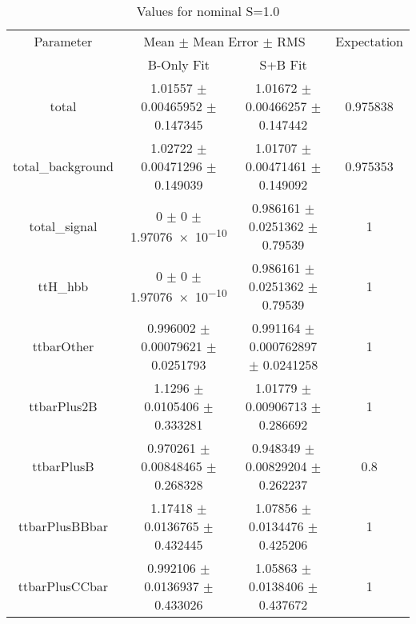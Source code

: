 \begin{table}
\centering
\caption{Values for nominal S=1.0}
\begin{tabular}{cccc}
\toprule
Parameter & \multicolumn{2}{c}{Mean $\pm$ Mean Error $\pm$ RMS} & Expectation\\
 & B-Only Fit & S+B Fit & \\
\midrule
total & \num{1.01557} $\pm$ \num{0.00465952} $\pm$ \num{0.147345} & \num{1.01672} $\pm$ \num{0.00466257} $\pm$ \num{0.147442} & \num{0.975838}\\
total\_background & \num{1.02722} $\pm$ \num{0.00471296} $\pm$ \num{0.149039} & \num{1.01707} $\pm$ \num{0.00471461} $\pm$ \num{0.149092} & \num{0.975353}\\
total\_signal & \num{0} $\pm$ \num{0} $\pm$ \num{1.97076e-10} & \num{0.986161} $\pm$ \num{0.0251362} $\pm$ \num{0.79539} & \num{1}\\
ttH\_hbb & \num{0} $\pm$ \num{0} $\pm$ \num{1.97076e-10} & \num{0.986161} $\pm$ \num{0.0251362} $\pm$ \num{0.79539} & \num{1}\\
ttbarOther & \num{0.996002} $\pm$ \num{0.00079621} $\pm$ \num{0.0251793} & \num{0.991164} $\pm$ \num{0.000762897} $\pm$ \num{0.0241258} & \num{1}\\
ttbarPlus2B & \num{1.1296} $\pm$ \num{0.0105406} $\pm$ \num{0.333281} & \num{1.01779} $\pm$ \num{0.00906713} $\pm$ \num{0.286692} & \num{1}\\
ttbarPlusB & \num{0.970261} $\pm$ \num{0.00848465} $\pm$ \num{0.268328} & \num{0.948349} $\pm$ \num{0.00829204} $\pm$ \num{0.262237} & \num{0.8}\\
ttbarPlusBBbar & \num{1.17418} $\pm$ \num{0.0136765} $\pm$ \num{0.432445} & \num{1.07856} $\pm$ \num{0.0134476} $\pm$ \num{0.425206} & \num{1}\\
ttbarPlusCCbar & \num{0.992106} $\pm$ \num{0.0136937} $\pm$ \num{0.433026} & \num{1.05863} $\pm$ \num{0.0138406} $\pm$ \num{0.437672} & \num{1}\\
\bottomrule
\end{tabular}
\end{table}